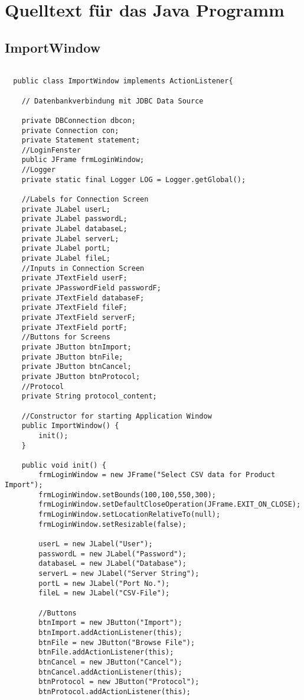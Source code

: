 \newpage

\appendix

\section{Quelltext für das Java Programm}

\subsection{ImportWindow}

\begin{lstlisting}

  public class ImportWindow implements ActionListener{

	// Datenbankverbindung mit JDBC Data Source

	private DBConnection dbcon;
	private Connection con;
	private Statement statement;
	//LoginFenster
	public JFrame frmLoginWindow;
	//Logger
	private static final Logger LOG = Logger.getGlobal();

	//Labels for Connection Screen
	private JLabel userL;
	private JLabel passwordL;
	private JLabel databaseL;
	private JLabel serverL;
	private JLabel portL;
	private JLabel fileL;
	//Inputs in Connection Screen
	private JTextField userF;
	private JPasswordField passwordF;
	private JTextField databaseF;
	private JTextField fileF;
	private JTextField serverF;
	private JTextField portF;
	//Buttons for Screens
	private JButton btnImport;
	private JButton btnFile;
	private JButton btnCancel;
	private JButton btnProtocol;
	//Protocol
	private String protocol_content;

	//Constructor for starting Application Window
	public ImportWindow() {
		init();
	}

	public void init() {
		frmLoginWindow = new JFrame("Select CSV data for Product Import");
		frmLoginWindow.setBounds(100,100,550,300);
		frmLoginWindow.setDefaultCloseOperation(JFrame.EXIT_ON_CLOSE);
		frmLoginWindow.setLocationRelativeTo(null);
		frmLoginWindow.setResizable(false);

		userL = new JLabel("User");
		passwordL = new JLabel("Password");
		databaseL = new JLabel("Database");
		serverL = new JLabel("Server String");
		portL = new JLabel("Port No.");
		fileL = new JLabel("CSV-File");

		//Buttons
		btnImport = new JButton("Import");
		btnImport.addActionListener(this);
		btnFile = new JButton("Browse File");
		btnFile.addActionListener(this);
		btnCancel = new JButton("Cancel");
		btnCancel.addActionListener(this);
		btnProtocol = new JButton("Protocol");
		btnProtocol.addActionListener(this);


\end{lstlisting}
